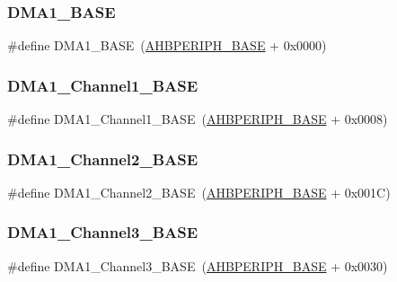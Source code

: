 \subsubsection{\texorpdfstring{DMA1\_BASE}{DMA1\_BASE}}
{\footnotesize\ttfamily \#define D\+M\+A1\+\_\+\+B\+A\+SE~(\mbox{\hyperlink{group___peripheral__memory__map_ga92eb5d49730765d2abd0f5b09548f9f5}{A\+H\+B\+P\+E\+R\+I\+P\+H\+\_\+\+B\+A\+SE}} + 0x0000)}

\mbox{\label{group___peripheral__memory__map_ga888dbc1608243badeb3554ffedc7364c}} 
\subsubsection{\texorpdfstring{DMA1\_Channel1\_BASE}{DMA1\_Channel1\_BASE}}
{\footnotesize\ttfamily \#define D\+M\+A1\+\_\+\+Channel1\+\_\+\+B\+A\+SE~(\mbox{\hyperlink{group___peripheral__memory__map_ga92eb5d49730765d2abd0f5b09548f9f5}{A\+H\+B\+P\+E\+R\+I\+P\+H\+\_\+\+B\+A\+SE}} + 0x0008)}

\mbox{\label{group___peripheral__memory__map_ga38a70090eef3687e83fa6ac0c6d22267}} 
\subsubsection{\texorpdfstring{DMA1\_Channel2\_BASE}{DMA1\_Channel2\_BASE}}
{\footnotesize\ttfamily \#define D\+M\+A1\+\_\+\+Channel2\+\_\+\+B\+A\+SE~(\mbox{\hyperlink{group___peripheral__memory__map_ga92eb5d49730765d2abd0f5b09548f9f5}{A\+H\+B\+P\+E\+R\+I\+P\+H\+\_\+\+B\+A\+SE}} + 0x001\+C)}

\mbox{\label{group___peripheral__memory__map_ga70b3d9f36ca9ce95b4e421c11154fe5d}} 
\subsubsection{\texorpdfstring{DMA1\_Channel3\_BASE}{DMA1\_Channel3\_BASE}}
{\footnotesize\ttfamily \#define D\+M\+A1\+\_\+\+Channel3\+\_\+\+B\+A\+SE~(\mbox{\hyperlink{group___peripheral__memory__map_ga92eb5d49730765d2abd0f5b09548f9f5}{A\+H\+B\+P\+E\+R\+I\+P\+H\+\_\+\+B\+A\+SE}} + 0x0030)}

